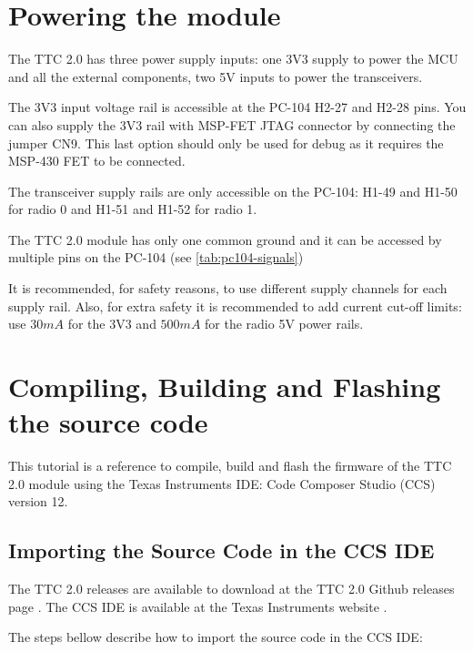 \section{Powering the module}

The TTC 2.0 has three power supply inputs: one 3V3 supply to power the MCU and all the external components, two 5V inputs to power the transceivers.

The 3V3 input voltage rail is accessible at the PC-104 H2-27 and H2-28 pins. You can also supply the 3V3 rail with MSP-FET JTAG connector by connecting the jumper CN9. This last option should only be used for debug as it requires the MSP-430 FET to be connected.

The transceiver supply rails are only accessible on the PC-104: H1-49 and H1-50 for radio 0 and H1-51 and H1-52 for radio 1. 

The TTC 2.0 module has only one common ground and it can be accessed by multiple pins on the PC-104 (see \autoref {tab:pc104-signals})

It is recommended, for safety reasons, to use different supply channels for each supply rail. Also, for extra safety it is recommended to add current cut-off limits: use $30 mA$ for the 3V3 and $500 mA$ for the radio 5V power rails. 

\section{Compiling, Building and Flashing the source code}

This tutorial is a reference to compile, build and flash the firmware of the TTC 2.0 module using the Texas Instruments IDE: Code Composer Studio (CCS) version 12.


\subsection{Importing the Source Code in the CCS IDE}
The TTC 2.0 releases are available to download at the TTC 2.0 Github releases page \cite{ttc2-releases}. The CCS IDE is available at the Texas Instruments website \cite{ccs-studio}.

The steps bellow describe how to import the source code in the CCS IDE:

